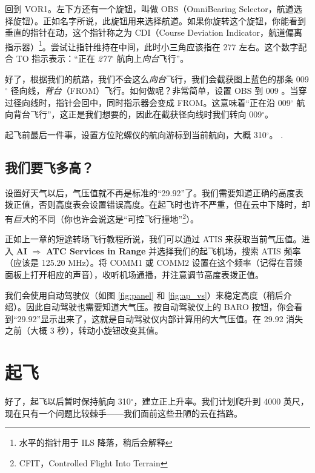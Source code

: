 回到 VOR1。左下方还有一个旋钮，叫做 OBS（OmniBearing Selector，航道选择旋钮）。正如名字所说，此旋钮用来选择航道。如果你旋转这个旋钮，你能看到垂直的指针在动，这个指针称之为 CDI（Course Deviation Indicator，航道偏离指示器）\footnote{水平的指针用于 ILS 降落，稍后会解释}。尝试让指针维持在中间，此时小三角应该指在 277 左右。这个数字配合 TO 指示表示：“正在 \emph{277$^\circ$} 航向上\emph{向台}飞行”。

好了，根据我们的航路，我们不会这么\emph{向台}飞行，我们会截获图上蓝色的那条 009$^\circ$ 径向线，\emph{背台}（FROM）飞行。如何做呢？非常简单，设置 OBS 到 009 。当穿过径向线时，指针会回中，同时指示器会变成 FROM。这意味着“正在沿 009$^\circ$ 航向背台飞行”，这正是我们想要的，因此在截获径向线时我们转向 009$^\circ$。

起飞前最后一件事，设置方位陀螺仪的航向游标到当前航向，大概 310$^\circ$。 .

\subsection{我们要飞多高？}

设置好天气以后，气压值就不再是标准的“29.92”了。我们需要知道正确的高度表拨正值，否则高度表会设置错误高度。在起飞时也许不严重，但在云中下降时，却有\emph{巨大}的不同（你也许会说这是“可控飞行撞地”\footnote{CFIT，Controlled Flight Into Terrain}）。

正如上一章的短途转场飞行教程所说，我们可以通过 ATIS 来获取当前气压值。进入 \textbf{\textsf{AI}} $\Rightarrow$ \textbf{\textsf{ATC Services in Range}} 并选择我们的起飞机场，搜索 ATIS 频率（应该是 125.20 MHz）。将 COMM1 或 COMM2 设置在这个频率（记得在音频面板上打开相应的声音），收听机场通播，并注意调节高度表拨正值。

我们会使用自动驾驶仪（如图 \ref{fig:panel} 和 \ref{fig:ap_vs}）来稳定高度（稍后介绍）。因此自动驾驶也需要知道大气压。按自动驾驶仪上的 BARO 按钮，你会看到“29.92”显示出来了，这就是自动驾驶仪内部计算用的大气压值。在 29.92 消失之前（大概 3 秒），转动小旋钮改变其值。

\section{起飞}

好了，起飞以后暂时保持航向 310$^\circ$，建立正上升率。我们计划爬升到 4000 英尺，现在只有一个问题比较棘手——我们面前这些丑陋的云在挡路。

